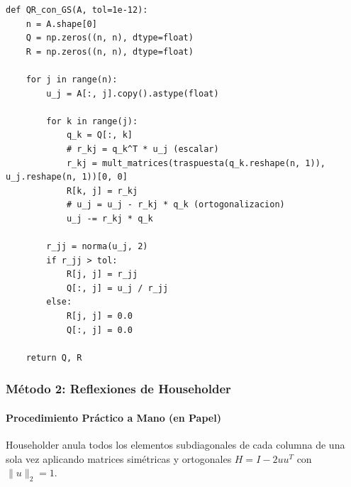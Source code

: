 \documentclass[11pt,a4paper]{article}
\begin{document}
\begin{verbatim}
def QR_con_GS(A, tol=1e-12):
    n = A.shape[0]
    Q = np.zeros((n, n), dtype=float)
    R = np.zeros((n, n), dtype=float)

    for j in range(n):
        u_j = A[:, j].copy().astype(float)
        
        for k in range(j):
            q_k = Q[:, k]
            # r_kj = q_k^T * u_j (escalar)
            r_kj = mult_matrices(traspuesta(q_k.reshape(n, 1)), u_j.reshape(n, 1))[0, 0]
            R[k, j] = r_kj
            # u_j = u_j - r_kj * q_k (ortogonalizacion)
            u_j -= r_kj * q_k
        
        r_jj = norma(u_j, 2)
        if r_jj > tol:
            R[j, j] = r_jj
            Q[:, j] = u_j / r_jj
        else:
            R[j, j] = 0.0
            Q[:, j] = 0.0

    return Q, R
\end{verbatim}

\subsubsection*{Método 2: Reflexiones de Householder}

\paragraph{Procedimiento Práctico a Mano (en Papel)}
Householder anula todos los elementos subdiagonales de cada columna de una sola vez aplicando matrices simétricas y ortogonales $H = I - 2 u u^T$ con $\|u\|_2 = 1$.
\end{document}
